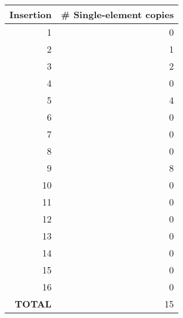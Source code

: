 \documentclass[12pt]{article}
\begin{document}
\begin{tabular}{|r|r|} \hline
Insertion  & \# Single-element copies \\ \hline
1 & 0 \\ \hline
2 & 1 \\ \hline
3 & 2 \\ \hline
4 & 0 \\ \hline
5 & 4 \\ \hline
6 & 0 \\ \hline
7 & 0 \\ \hline
8 & 0 \\ \hline
9 & 8 \\ \hline
10 & 0 \\ \hline
11 & 0 \\ \hline
12 & 0 \\ \hline
13 & 0 \\ \hline
14 & 0 \\ \hline
15 & 0   \\ \hline
16 & 0   \\ \hline
{\bf TOTAL} & 15 \\ \hline
\end{tabular}
\end{document}
